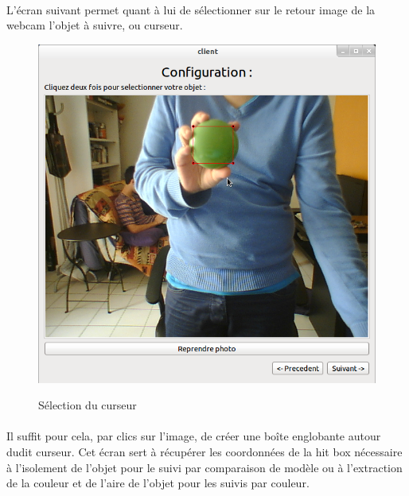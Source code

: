 \documentclass{report}
\begin{document}
				\paragraph{}
				L'écran suivant permet quant à lui de sélectionner sur le retour image de la webcam l'objet à suivre, ou curseur.\\
				\begin{figure}[!h]
						\centering
						\includegraphics[scale=0.35]{../images/Capture1.png}\\
						\caption{Sélection du curseur}
						\label{Sélection du curseur}
				\end{figure}
				\paragraph{}
				Il suffit pour cela, par clics sur l'image, de créer une boîte englobante autour dudit curseur.
				Cet écran sert à récupérer les coordonnées de la hit box nécessaire à l'isolement de l'objet pour le suivi par comparaison de modèle ou à l'extraction de la couleur et de l'aire de l'objet pour les suivis par couleur.
				\newpage
\end{document}
